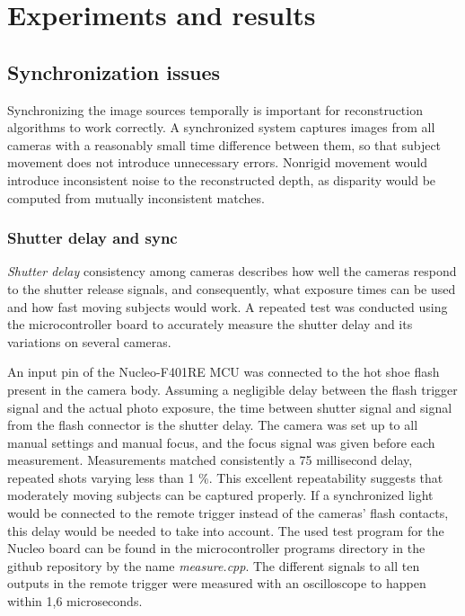 \section{Experiments and results} \label{sec:experiments}


\subsection{Synchronization issues}

Synchronizing the image sources temporally is important for reconstruction algorithms to work correctly.
A synchronized system captures images from all cameras with a reasonably small time difference between them, so that subject movement does not introduce unnecessary errors.
Nonrigid movement would introduce inconsistent noise to the reconstructed depth, as disparity would be computed from mutually inconsistent matches.

\subsubsection{Shutter delay and sync} \label{sec:shutterdelaymeas}

\emph{Shutter delay} consistency among cameras describes how well the cameras respond to the shutter release signals, and consequently, what exposure times can be used and how fast moving subjects would work.
A repeated test was conducted using the microcontroller board to accurately measure the shutter delay and its variations on several cameras.

An input pin of the Nucleo-F401RE MCU was connected to the hot shoe flash present in the camera body.
Assuming a negligible delay between the flash trigger signal and the actual photo exposure, the time between shutter signal and signal from the flash connector is the shutter delay.
The camera was set up to all manual settings and manual focus, and the focus signal was given before each measurement.
Measurements matched consistently a 75 millisecond delay, repeated shots varying less than 1 \%.
This excellent repeatability suggests that moderately moving subjects can be captured properly.
If a synchronized light would be connected to the remote trigger instead of the cameras' flash contacts, this delay would be needed to take into account.
The used test program for the Nucleo board can be found in the microcontroller programs directory in the github repository by the name \emph{measure.cpp}.
The different signals to all ten outputs in the remote trigger were measured with an oscilloscope to happen within 1,6 microseconds.

